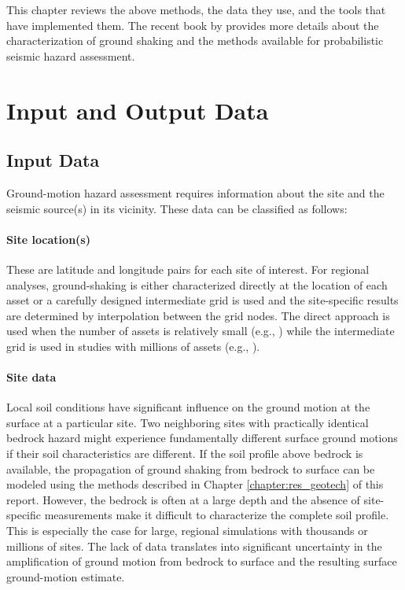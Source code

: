 This chapter reviews the above methods, the data they use, and the tools that have implemented them. The recent book by \citet{baker2021seismic} provides more details about the characterization of ground shaking and the methods available for probabilistic seismic hazard assessment. 

\section{Input and Output Data}
\label{sec:eq_shake_io}

\subsection{Input Data}

Ground-motion hazard assessment requires information about the site and the seismic source(s) in its vicinity. These data can be classified as follows:

\paragraph{Site location(s)} These are latitude and longitude pairs for each site of interest. For regional analyses, ground-shaking is either characterized directly at the location of each asset or a carefully designed intermediate grid is used and the site-specific results are determined by interpolation between the grid nodes. The direct approach is used when the number of assets is relatively small (e.g., \cite{padgett2010regional}) while the intermediate grid is used in studies with millions of assets (e.g., \cite{deierlein2020cloud}).


\paragraph{Site data} Local soil conditions have significant influence on the ground motion at the surface at a particular site. Two neighboring sites with practically identical bedrock hazard might experience fundamentally different surface ground motions if their soil characteristics are different. If the soil profile above bedrock is available, the propagation of ground shaking from bedrock to surface can be modeled using the methods described in Chapter \ref{chapter:res_geotech} of this report. However, the bedrock is often at a large depth and the absence of site-specific measurements make it difficult to characterize the complete soil profile. This is especially the case for large, regional simulations with thousands or millions of sites. The lack of data translates into significant uncertainty in the amplification of ground motion from bedrock to surface and the resulting surface ground-motion estimate. 

